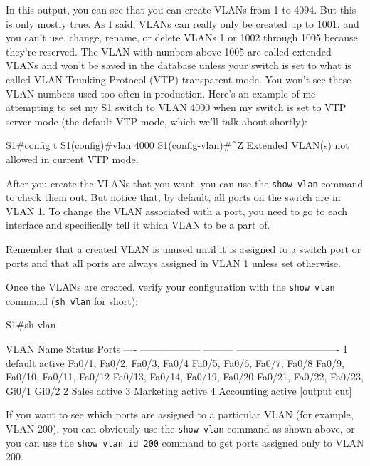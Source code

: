 In this output, you can see that you can create VLANs from 1 to 4094.
But this is only mostly true. As I said, VLANs can really only be
created up to 1001, and you can't use, change, rename, or delete VLANs 1
or 1002 through 1005 because they're reserved. The VLAN with numbers
above 1005 are called extended VLANs and won't be saved in the database
unless your switch is set to what is called VLAN Trunking Protocol (VTP)
transparent mode. You won't see these VLAN numbers used too often in
production. Here's an example of me attempting to set my S1 switch to
VLAN 4000 when my switch is set to VTP server mode (the default VTP
mode, which we'll talk about shortly):

\begin{cli}
S1#config t
S1(config)#vlan 4000
S1(config-vlan)#^Z
Extended VLAN(s) not allowed in current VTP mode.
\end{cli}

After you create the VLANs that you want, you can use the
\texttt{show\ vlan} command to check them out.
But notice that, by default, all ports on the switch are in VLAN 1.
To change the VLAN associated with a port, you need to go to each interface and specifically tell it which VLAN to be a part of.

\begin{note}
Remember that a created VLAN is unused until it is assigned to a switch port or ports and that all ports are always assigned in VLAN 1 unless set otherwise.
\end{note}

Once the VLANs are created, verify your configuration with the \texttt{show\ vlan} command (\texttt{sh\ vlan} for short):

\begin{cli}
S1#sh vlan

VLAN Name               Status    Ports
---- ------------------ --------- -------------------------------
1    default            active    Fa0/1, Fa0/2, Fa0/3, Fa0/4
                                  Fa0/5, Fa0/6, Fa0/7, Fa0/8
                                  Fa0/9, Fa0/10, Fa0/11, Fa0/12
                                  Fa0/13, Fa0/14, Fa0/19, Fa0/20
                                  Fa0/21, Fa0/22, Fa0/23, Gi0/1
                                  Gi0/2
2    Sales              active
3    Marketing          active
4    Accounting         active
[output cut]
\end{cli}

If you want to see which ports are assigned to a particular VLAN (for
example, VLAN 200), you can obviously use the \texttt{show\ vlan}
command as shown above, or you can use the \texttt{show\ vlan\ id\ 200}
command to get ports assigned only to VLAN 200.

